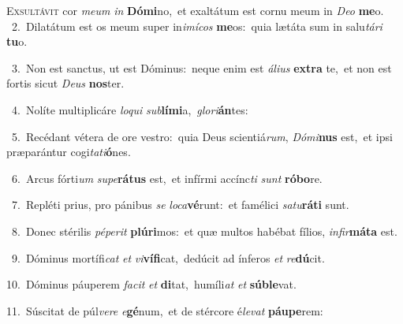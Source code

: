 \lettrine{\initial\textcolor{\initialcolor}{E}}{xsultávit} cor \textit{me}\-\textit{um} \textit{in} \textbf{Dó}\-\textbf{mi}no,~\star et exaltátum est cornu meum in \textit{De}\-\textit{o} \textbf{me}\-o.\\
{\numbfont\textcolor{\numbcolor}{~2.}}~Dilatátum est os meum super in\-\textit{i}\-\textit{mí}\textit{cos} \textbf{me}\-os:~\star quia lætáta sum in salu\-\textit{tá}\-\textit{ri} \textbf{tu}\-o.\par
{\numbfont\textcolor{\numbcolor}{~3.}}~Non est sanctus, ut est Dóminus:~\dagger neque enim est \textit{á}\-\textit{li}\textit{us} \textbf{ex}\-\textbf{tra} te,~\star et non est fortis sicut \textit{De}\-\textit{us} \textbf{nos}\-ter.\par
{\numbfont\textcolor{\numbcolor}{~4.}}~Nolíte multiplicáre \textit{lo}\-\textit{qui} \textit{sub}\-\textbf{lí}\textbf{mi}a,~\star \textit{glo}\-\textit{ri}\textbf{án}tes:\par
{\numbfont\textcolor{\numbcolor}{~5.}}~Recédant vétera de ore vestro:~\dagger quia Deus scientiá\-\textit{rum}\-, \textit{Dó}\-\textit{mi}\textbf{nus} est,~\star et ipsi præparántur cogi\-\textit{ta}\-\textit{ti}\textbf{ó}nes.\par
{\numbfont\textcolor{\numbcolor}{~6.}}~Arcus fórti\textit{um} \textit{su}\-\textit{pe}\textbf{rá}\textbf{tus} est,~\star et infírmi accínc\textit{ti} \textit{sunt} \textbf{ró}\-\textbf{bo}re.\par
{\numbfont\textcolor{\numbcolor}{~7.}}~Repléti prius, pro pánibus \textit{se} \textit{lo}\-\textit{ca}\textbf{vé}runt:~\star et famélici \textit{sa}\-\textit{tu}\textbf{rá}\textbf{ti} sunt.\par
{\numbfont\textcolor{\numbcolor}{~8.}}~Donec stérilis \textit{pé}\-\textit{pe}\textit{rit} \textbf{plú}\-\textbf{ri}mos:~\star et quæ multos habébat fílios, \textit{in}\-\textit{fir}\textbf{má}\textbf{ta} est.\par
{\numbfont\textcolor{\numbcolor}{~9.}}~Dóminus mortífi\textit{cat} \textit{et} \textit{vi}\-\textbf{ví}\textbf{fi}cat,~\star dedúcit ad ínferos \textit{et} \textit{re}\-\textbf{dú}cit.\par
{\numbfont\textcolor{\numbcolor}{10.}}~Dóminus páuperem \textit{fa}\-\textit{cit} \textit{et} \textbf{di}\-tat,~\star humíli\textit{at} \textit{et} \textbf{súb}\-\textbf{le}vat.\par
{\numbfont\textcolor{\numbcolor}{11.}}~Súscitat de púl\-\textit{ve}\-\textit{re} \textit{e}\-\textbf{gé}num,~\star et de stércore é\-\textit{le}\-\textit{vat} \textbf{páu}\-\textbf{pe}rem:\par
